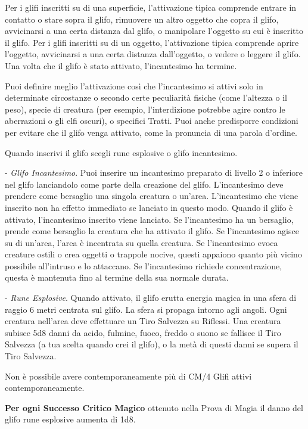 \begin{multicols}{2}
Per i glifi inscritti su di una superficie, l'attivazione tipica comprende entrare in contatto o stare sopra il glifo, rimuovere un altro oggetto che copra il glifo, avvicinarsi a una certa distanza dal glifo, o manipolare l'oggetto su cui è inscritto il glifo. Per i glifi inscritti su di un oggetto, l'attivazione tipica comprende aprire l'oggetto, avvicinarsi a una certa distanza dall'oggetto, o vedere o leggere il glifo. Una volta che il glifo è stato attivato, l'incantesimo ha termine.

Puoi definire meglio l'attivazione così che l'incantesimo si attivi solo in determinate circostanze o secondo certe peculiarità fisiche (come l'altezza o il peso), specie di creatura (per esempio, l'interdizione potrebbe agire contro le aberrazioni o gli elfi oscuri), o specifici Tratti. Puoi anche predisporre condizioni per evitare che il glifo venga attivato, come la pronuncia di una parola d'ordine.

Quando inscrivi il glifo scegli rune esplosive o glifo incantesimo.

\medskip

- \emph{Glifo Incantesimo}. Puoi inserire un incantesimo preparato di livello 2 o inferiore nel glifo lanciandolo come parte della creazione del glifo. L'incantesimo deve prendere come bersaglio una singola creatura o un'area. L'incantesimo che viene inserito non ha effetto immediato se lanciato in questo modo. Quando il glifo è attivato, l'incantesimo inserito viene lanciato. Se l'incantesimo ha un bersaglio, prende come bersaglio la creatura che ha attivato il glifo. Se l'incantesimo agisce su di un'area, l'area è incentrata su quella creatura. Se l'incantesimo evoca creature ostili o crea oggetti o trappole nocive, questi appaiono quanto più vicino possibile all'intruso e lo attaccano. Se l'incantesimo richiede concentrazione, questa è mantenuta fino al termine della sua normale durata.

- \emph{Rune Esplosive}. Quando attivato, il glifo erutta energia magica in una sfera di raggio 6 metri centrata sul glifo. La sfera si propaga intorno agli angoli. Ogni creatura nell'area deve effettuare un Tiro Salvezza su Riflessi. Una creatura subisce 5d8 danni da acido, fulmine, fuoco, freddo o suono se fallisce il Tiro Salvezza (a tua scelta quando crei il glifo), o la metà di questi danni se supera il Tiro Salvezza.

Non è possibile avere contemporaneamente più di CM/4 Glifi attivi contemporaneamente.

\textbf{Per ogni Successo Critico Magico} ottenuto nella Prova di Magia il danno del glifo rune esplosive aumenta di 1d8.


\end{multicols}
